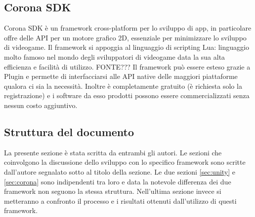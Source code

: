 		\subsection{Corona SDK}
			Corona SDK è un framework cross-platform per lo sviluppo di app, in particolare offre delle API per un motore grafico 2D, essenziale per minimizzare lo sviluppo di videogame. Il framework si appoggia al linguaggio di scripting Lua: linguaggio molto famoso nel mondo degli sviluppatori di videogame data la sua alta efficienza e facilità di utilizzo. FONTE??? Il framework può essere esteso grazie a Plugin e permette di interfacciarsi alle API native delle maggiori piattaforme qualora ci sia la necessità. Inoltre è completamente gratuito (è richiesta solo la registrazione) e i software da esso prodotti possono essere commercializzati senza nessun costo aggiuntivo.
		
		
	\subsection{Struttura del documento}
		La presente sezione è stata scritta da entrambi gli autori. Le sezioni che coinvolgono la discussione dello sviluppo con lo specifico framework sono scritte dall'autore segnalato sotto al titolo della sezione. Le due sezioni \ref{sec:unity} e \ref{sec:corona} sono indipendenti tra loro e data la notevole differenza dei due framework non seguono la stessa struttura. Nell'ultima sezione invece si metteranno a confronto il processo e i risultati ottenuti dall'utilizzo di questi framework.
	
	